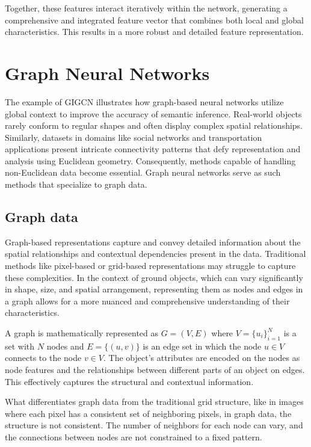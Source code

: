 Together, these features interact iteratively within the network, generating a comprehensive and integrated feature vector that combines both local and global characteristics. This results in a more robust and detailed feature representation.

\section{Graph Neural Networks}
The example of GIGCN illustrates how graph-based neural networks utilize global context to improve the accuracy of semantic inference. Real-world objects rarely conform to regular shapes and often display complex spatial relationships. Similarly, datasets in domains like social networks and transportation applications present intricate connectivity patterns that defy representation and analysis using Euclidean geometry. Consequently, methods capable of handling non-Euclidean data become essential. Graph neural networks serve as such methods that specialize to graph data.

\subsection{Graph data}
Graph-based representations capture and convey detailed information about the spatial relationships and contextual dependencies present in the data. Traditional methods like pixel-based or grid-based representations may struggle to capture these complexities. In the context of ground objects, which can vary significantly in shape, size, and spatial arrangement, representing them as nodes and edges in a graph allows for a more nuanced and comprehensive understanding of their characteristics.

A graph is mathematically represented as $G=(V, E)$ where $V = \{u_i\}_{i=1}^N$ is a set with $N$ nodes and $E = \{(u, v)\}$ is an edge set in which the node $u \in V$ connects to the node $v \in V$.
The object's attributes are encoded on the nodes as node features and the relationships between different parts of an object on edges. This effectively captures the structural and contextual information\cite{jia_graph--graph_2024}.

What differentiates graph data from the traditional grid structure, like in images where each pixel has a consistent set of neighboring pixels, in graph data, the structure is not consistent. The number of neighbors for each node can vary, and the connections between nodes are not constrained to a fixed pattern\cite{daigavane_understanding_2021}.

